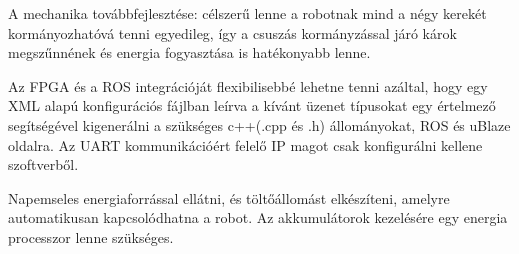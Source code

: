 A mechanika továbbfejlesztése: célszerű lenne a robotnak mind a négy kerekét kormányozhatóvá tenni egyedileg, így a csuszás kormányzással járó károk megszűnnének és energia fogyasztása is hatékonyabb lenne.

Az FPGA és a ROS integrációját flexibilisebbé lehetne tenni azáltal, hogy egy XML alapú konfigurációs fájlban leírva a kívánt üzenet típusokat egy értelmező segítségével kigenerálni a szükséges c++(.cpp és .h) állományokat, ROS és uBlaze oldalra. Az UART kommunikációért felelő IP magot csak konfigurálni kellene szoftverből.


Napemseles energiaforrással ellátni, és töltőállomást elkészíteni, amelyre automatikusan kapcsolódhatna a robot. Az akkumulátorok kezelésére egy energia processzor lenne szükséges.